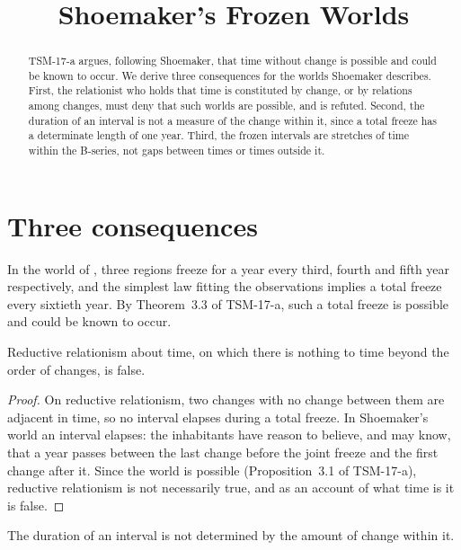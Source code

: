 \documentclass{situationist-preprint}
\title{Shoemaker's Frozen Worlds}
\begin{document}
\maketitle

\begin{abstract}
TSM-17-a argues, following Shoemaker, that time without change is possible and could be known to occur. We derive three consequences for the worlds Shoemaker describes. First, the relationist who holds that time is constituted by change, or by relations among changes, must deny that such worlds are possible, and is refuted. Second, the duration of an interval is not a measure of the change within it, since a total freeze has a determinate length of one year. Third, the frozen intervals are stretches of time within the B-series, not gaps between times or times outside it.
\end{abstract}

\section{Three consequences}

In the world of \citet{Shoemaker1969}, three regions freeze for a year every third, fourth and fifth year respectively, and the simplest law fitting the observations implies a total freeze every sixtieth year. By Theorem~3.3 of TSM-17-a, such a total freeze is possible and could be known to occur.

\begin{corollary}\label{c:rel}
Reductive relationism about time, on which there is nothing to time beyond the order of changes, is false.
\end{corollary}

\begin{proof}
On reductive relationism, two changes with no change between them are adjacent in time, so no interval elapses during a total freeze. In Shoemaker's world an interval elapses: the inhabitants have reason to believe, and may know, that a year passes between the last change before the joint freeze and the first change after it. Since the world is possible (Proposition~3.1 of TSM-17-a), reductive relationism is not necessarily true, and as an account of what time is it is false.
\end{proof}

\begin{corollary}\label{c:metric}
The duration of an interval is not determined by the amount of change within it.
\end{corollary}
\end{document}
